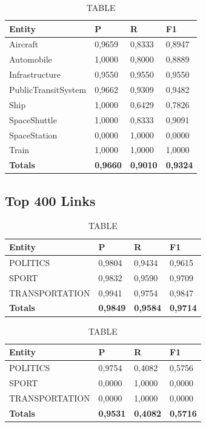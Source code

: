 \documentclass[thesis=M,english]{FITthesis}[2018/05/30]
\begin{document}
	
	\begin{table}[H]\centering
		\caption{TABLE}
		\label{}
		\begin{tabular}{|l|l|l|l|}
			\hline {\textbf{Entity}} & {\textbf{P}} & {\textbf{R}} & {\textbf{F1}}\\\hline
				Aircraft & 0,9659 & 0,8333 & 0,8947\\
				Automobile & 1,0000 & 0,8000 & 0,8889\\				
				Infrastructure & 0,9550 & 0,9550 & 0,9550\\
				PublicTransitSystem & 0,9662 & 0,9309 & 0,9482\\
				Ship & 1,0000 & 0,6429 & 0,7826\\				
				SpaceShuttle & 1,0000 & 0,8333 & 0,9091\\
				SpaceStation & 0,0000 & 1,0000 & 0,0000\\
				Train & 1,0000 & 1,0000 & 1,0000\\\hline
				\textbf{Totals} & \textbf{0,9660} & \textbf{0,9010} & \textbf{0,9324}\\\hline
		\end{tabular}
	\end{table}	


\subsection{Top 400 Links}

	\begin{table}[H]\centering
		\caption{TABLE}
		\label{}
		\begin{tabular}{|l|l|l|l|}
			\hline {\textbf{Entity}} & {\textbf{P}} & {\textbf{R}} & {\textbf{F1}}\\\hline
				POLITICS & 0,9804 & 0,9434 & 0,9615\\
				SPORT & 0,9832 & 0,9590 & 0,9709\\
				TRANSPORTATION & 0,9941 & 0,9754 & 0,9847\\\hline
				\textbf{Totals} & \textbf{0,9849} & \textbf{0,9584} & \textbf{0,9714}\\\hline
		\end{tabular}
	\end{table}

	\begin{table}[H]\centering
		\caption{TABLE}
		\label{}
		\begin{tabular}{|l|l|l|l|}
			\hline {\textbf{Entity}} & {\textbf{P}} & {\textbf{R}} & {\textbf{F1}}\\\hline
				POLITICS & 0,9754 & 0,4082 & 0,5756\\
				SPORT & 0,0000 & 1,0000 & 0,0000\\
				TRANSPORTATION & 0,0000 & 1,0000 & 0,0000\\\hline
				\textbf{Totals} & \textbf{0,9531} & \textbf{0,4082} & \textbf{0,5716}\\\hline
		\end{tabular}
	\end{table}
\end{document}
